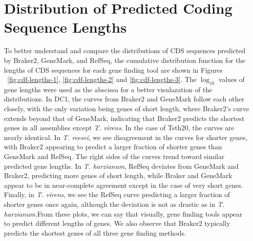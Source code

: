 \section{Distribution of Predicted Coding Sequence Lengths}
\label{section:lengths}

To better understand and compare the distributions of CDS sequences
predicted by Braker2, GeneMark, and RefSeq, the cumulative
distribution function for the lengths of CDS sequences for each gene
finding tool are shown in Figures ~\ref{fig:cdf-lengths-1},
\ref{fig:cdf-lengths-2} and \ref{fig:cdf-lengths-3}. The $\log_{10}$
values of gene lengths were used as the abscissa for a better
visulazation of the distributions. In DC1, the curves from Braker2 and
GeneMark follow each other closely, with the only variation being
genes of short length, where Braker2's curve extends beyond that of
GeneMark, indicating that Braker2 predicts the shortest genes in all
assemblies except \textit{T. virens}. In the case of Tsth20, the
curves are nearly identical. In \textit{T. reesei}, we see
disagreement in the curves for shorter genes, with Braker2 appearing
to predict a larger fraction of shorter genes than GeneMark and
RefSeq. The right sides of the curves trend toward similar predicted
gene lengths. In \textit{T. harzianum}, RefSeq deviates from GeneMark
and Braker2, predicting more genes of short length, while Braker and
GeneMark appear to be in near-complete agreement except in the case of
very short genes. Finally, in \textit{T. virens}, we see the RefSeq
curve predicting a larger fraction of shorter genes once again,
although the deviation is not as drastic as in
\textit{T. harzianum}.From these plots, we can say that visually, gene
finding tools appear to predict different lengths of genes. We also
observe that Braker2 typically predicts the shortest genes of all
three gene finding methods.

